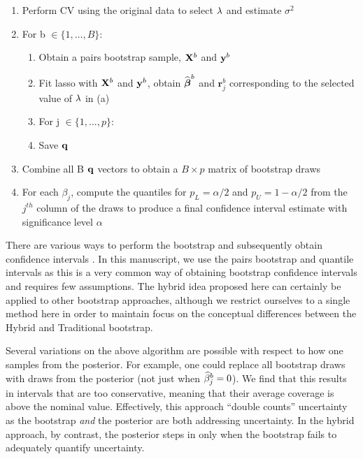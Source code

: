 \begin{enumerate}
\item Perform CV using the original data to select $\lambda$ and estimate $\sigma^2$
\item For b $\in \lbrace 1, \ldots, B \rbrace$:
\begin{enumerate}
\item Obtain a pairs bootstrap sample, $\mathbf{X}^b$ and $\mathbf{y}^b$
\item Fit lasso with $\mathbf{X}^b$ and $\mathbf{y}^b$, obtain $\widehat{\boldsymbol{\beta}}^b$ and $\boldsymbol{r}_j^b$ corresponding to the selected value of $\lambda$ in (a)
\item For j $\in \lbrace 1, \ldots, p \rbrace$:
	\begin{algorithmic}
    \EndCase
    \EndCase
	\EndSwitch
	\end{algorithmic}
\item Save $\mathbf{q}$
\end{enumerate}
\item Combine all B $\mathbf{q}$ vectors to obtain a $B \times p$ matrix of bootstrap draws
\item For each $\beta_j$, compute the quantiles for $p_L = \alpha/2$ and $p_U = 1 - \alpha/2$ from the $j^{th}$ column of the draws to produce a final confidence interval estimate with significance level $\alpha$
\end{enumerate}

There are various ways to perform the bootstrap and subsequently obtain confidence intervals \citep{Efron1994}. In this manuscript, we use the pairs bootstrap and quantile intervals as this is a very common way of obtaining bootstrap confidence intervals and requires few assumptions. The hybrid idea proposed here can certainly be applied to other bootstrap approaches, although we restrict ourselves to a single method here in order to maintain focus on the conceptual differences between the Hybrid and Traditional bootstrap.

Several variations on the above algorithm are possible with respect to how one samples from the posterior. For example, one could replace all bootstrap draws with draws from the posterior (not just when $\widehat{\beta}_j^b = 0$). We find that this results in intervals that are too conservative, meaning that their average coverage is above the nominal value.  Effectively, this approach ``double counts'' uncertainty as the bootstrap \emph{and} the posterior are both addressing uncertainty. In the hybrid approach, by contrast, the posterior steps in only when the bootstrap fails to adequately quantify uncertainty. 

